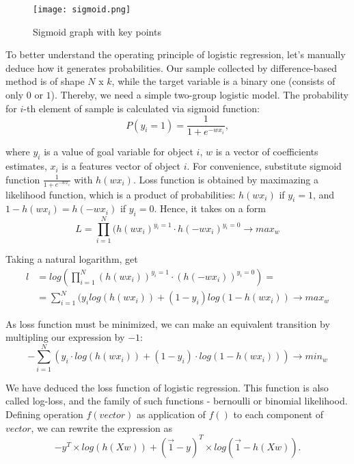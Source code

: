\documentclass[a4paper, 12pt]{extreport}
\begin{document}
\begin{figure}
  \texttt{[image: sigmoid.png]}
  \caption{Sigmoid graph with key points}
\end{figure}

To better understand the operating principle of logistic regression, let's manually deduce how it generates probabilities. Our sample collected by difference-based method is of shape $N$ x $k$, while
the target variable is a binary one (consists of only $0$ or $1$). Thereby, we need a simple two-group logistic model. The probability for $i$-th element of sample is calculated via sigmoid function:
\begin{equation}
	P(y_i = 1) = \frac{1}{1 + e^{-wx_i}},
\end{equation}

where $y_i$ is a value of goal variable for object $i$, $w$ is a vector of coefficients estimates, $x_i$ is a features vector of object $i$. For convenience, substitute sigmoid function $\frac{1}{1 + e^{-wx_i}}$
with $h(wx_i)$. Loss function is obtained by maximazing a likelihood function, which is a product of probabilities: $h(wx_i)$ if $y_i = 1$, and $1 - h(wx_i) = h(-wx_i)$ if $y_i = 0$. Hence, it takes on a form
\begin{equation}
	L = \prod_{i=1}^N (h(wx_i)^{y_i = 1} \cdot h(-wx_i)^{y_i = 0} \rightarrow max_{w}
\end{equation}

Taking a natural logarithm, get
\begin{align}
	l &= log (\prod_{i=1}^N (h(wx_i))^{y_i = 1} \cdot (h(-wx_i))^{y_i = 0}) = \nonumber \\
	&= \sum_{i=1}^N (y_i log(h(wx_i)) + (1 - y_i) log(1 - h(wx_i)) \rightarrow max_w
\end{align}

As loss function must be minimized, we can make an equivalent transition by multipling our expression by $-1$:
\begin{equation}
	- \sum_{i=1}^N (y_i \cdot log(h(wx_i)) + (1 - y_i) \cdot log(1 - h(wx_i))) \rightarrow min_w
\end{equation}

We have deduced the loss function of logistic regression. This function is also called log-loss, and the family of such functions - bernoulli or binomial likelihood. Defining operation $f(vector)$ as application of $f()$ to each component of $vector$, we can rewrite
the expression as
\begin{equation}
	- y^T \times log(h(Xw)) + (\vec 1 - y)^T \times log(\vec 1 - h(Xw)).
\end{equation}
\end{document}
